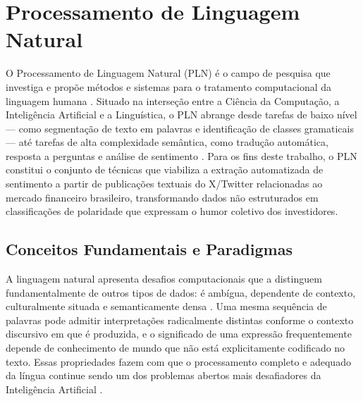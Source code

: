 
\section{Processamento de Linguagem Natural}
\label{sec:pln}

O Processamento de Linguagem Natural (PLN) é o campo de pesquisa que investiga e propõe métodos e sistemas para o tratamento computacional da linguagem humana
\cite{caseli2024cap1}. Situado na interseção entre a Ciência da Computação, a Inteligência Artificial e a Linguística, o PLN abrange desde tarefas de baixo nível --- como segmentação de texto em palavras e identificação de classes gramaticais --- até tarefas de alta complexidade semântica, como tradução automática, resposta a perguntas e análise de sentimento \cite{jurafsky2026}. Para os fins deste trabalho, o PLN constitui o conjunto de técnicas que viabiliza a extração automatizada de sentimento a partir de publicações textuais do X/Twitter relacionadas ao mercado financeiro brasileiro, transformando dados não estruturados em classificações de polaridade que expressam o humor coletivo dos investidores.


\subsection{Conceitos Fundamentais e Paradigmas}
\label{subsec:pln_paradigmas}

A linguagem natural apresenta desafios computacionais que a distinguem fundamentalmente de outros tipos de dados: é ambígua, dependente de contexto, culturalmente situada e semanticamente densa \cite{caseli2024cap1}. Uma mesma sequência de palavras pode admitir interpretações radicalmente distintas conforme o contexto discursivo em que é produzida, e o significado de uma expressão frequentemente depende de conhecimento de mundo que não está explicitamente codificado no texto. Essas propriedades fazem com que o processamento completo e adequado da língua continue sendo um dos problemas abertos mais desafiadores da Inteligência Artificial \cite{caseli2024cap1,jurafsky2026}.


